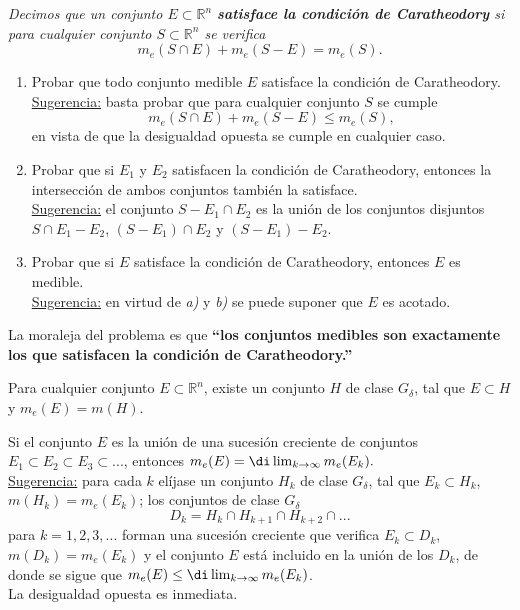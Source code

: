 \documentclass{book}
\newcommand{\rr}{\mathbb{R}}
\begin{document}
  \begin{ejer} {} 
	{\it{Decimos que un conjunto $E\subset \rr^n$ 
  {\bf{satisface la condición de Caratheodory}}
  si para cualquier conjunto $S\subset \rr^n$ se verifica}} 
  $$m_e(S\cap E)+m_e(S-E)=m_e(S). $$
	\begin{enumerate}   
    \item Probar que todo conjunto medible $E$ satisface la condición de Caratheodory.
    \\
    \underline{Sugerencia:} basta probar que para cualquier conjunto $S$ se cumple
    $$m_e(S\cap E)+m_e(S-E)\leq m_e(S), $$
    en vista de que la desigualdad opuesta se cumple en cualquier caso.
 
    \item Probar que si $E_1$ y $E_2$ satisfacen la condición de Caratheodory, 
    entonces la intersección de ambos conjuntos también la satisface.
    \\
    \underline{Sugerencia:} el conjunto $S-E_1\cap E_2$ es la unión de los conjuntos 
    disjuntos $S\cap E_1-E_2$, $(S-E_1)\cap E_2$ y $(S-E_1)-E_2$.

    \item Probar que si $E$ satisface la condición de Caratheodory, entonces $E$ es medible.
    \\
    \underline{Sugerencia:} en virtud de {\it{a)}} y {\it{b)}} se puede suponer que $E$ es acotado.
	\end{enumerate}
    La moraleja del problema es que 
    {\bf{``los conjuntos medibles son exactamente los que satisfacen
    la condición de Caratheodory.''}}
  \end{ejer} 
	
	
  \begin{ejer} {}
	\label{ej-guia}
  Para cualquier conjunto $E \subset \rr^n$, existe un conjunto $H$ de clase $G_{\delta}$,
  tal que $E \subset H$ y $m_e(E)=m(H)$.
	\end{ejer} 

  \begin{ejer} {}
  Si el conjunto $E$ es la unión de una sucesión creciente de conjuntos 
  $E_1\subset E_2\subset E_3\subset...$, entonces 
  $ m_e(E)=\di\lim_{k\rightarrow \infty} m_e(E_k).$
  \\
  \underline{Sugerencia:} para cada $k$ elíjase un conjunto $H_k$ de clase $G_{\delta}$,
  tal que $E_k\subset H_k$, $m(H_k)=m_e(E_k)$; los conjuntos de clase $G_{\delta}$
  $$D_k=H_k\cap H_{k+1}\cap H_{k+2}\cap... $$
  para $k=1,2,3,...$ forman una sucesión creciente que verifica $E_k \subset D_k$,
  $m(D_k)=m_e(E_k)$ y el conjunto $E$ está incluido en la unión de los $D_k$, de donde
  se sigue que $m_e(E)\leq \di\lim_{k\rightarrow \infty} m_e(E_k)$.
  \\
  La desigualdad opuesta es inmediata.
 \end{ejer}
\end{document}
